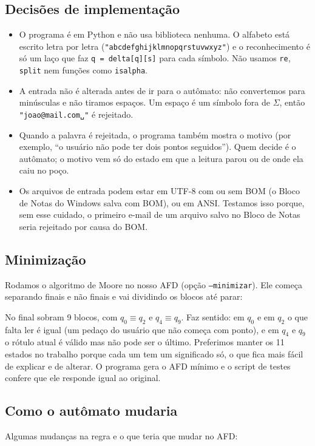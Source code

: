\documentclass[11pt,a4paper]{article}
\newcommand{\s}[1]{\texttt{#1}}
\newcommand{\q}[1]{$q_{#1}$}
\begin{document}
\subsection{Decisões de implementação}
\begin{itemize}
  \item O programa é em Python e não usa biblioteca nenhuma. O alfabeto está escrito letra por letra
        (\s{"abcdefghijklmnopqrstuvwxyz"}) e o reconhecimento é só um laço que faz \s{q = delta[q][s]} para
        cada símbolo. Não usamos \s{re}, \s{split} nem funções como \s{isalpha}.
  \item A entrada não é alterada antes de ir para o autômato: não convertemos para minúsculas e não tiramos
        espaços. Um espaço é um símbolo fora de $\Sigma$, então \s{"joao@mail.com␣"} é rejeitado.
  \item Quando a palavra é rejeitada, o programa também mostra o motivo (por exemplo, ``o usuário não pode ter
        dois pontos seguidos''). Quem decide é o autômato; o motivo vem só do estado em que a leitura parou ou de
        onde ela caiu no poço.
  \item Os arquivos de entrada podem estar em UTF-8 com ou sem BOM (o Bloco de Notas do Windows salva com BOM),
        ou em ANSI. Testamos isso porque, sem esse cuidado, o primeiro e-mail de um arquivo salvo no Bloco de Notas
        seria rejeitado por causa do BOM.
\end{itemize}

\subsection{Minimização}
Rodamos o algoritmo de Moore no nosso AFD (opção \s{--minimizar}). Ele começa separando finais e não finais e
vai dividindo os blocos até parar:
\begin{center}\TabelaMinimizacao\end{center}
No final sobram 9 blocos, com $q_0 \equiv q_2$ e $q_4 \equiv q_9$. Faz sentido: em \q0 e em \q2 o que falta ler é
igual (um pedaço do usuário que não começa com ponto), e em \q4 e \q9 o rótulo atual é válido mas não pode ser o
último. Preferimos manter os 11 estados no trabalho porque cada um tem um significado só, o que fica mais fácil de
explicar e de alterar. O programa gera o AFD mínimo e o script de testes confere que ele responde igual ao original.

\subsection{Como o autômato mudaria}
Algumas mudanças na regra e o que teria que mudar no AFD:
\end{document}
